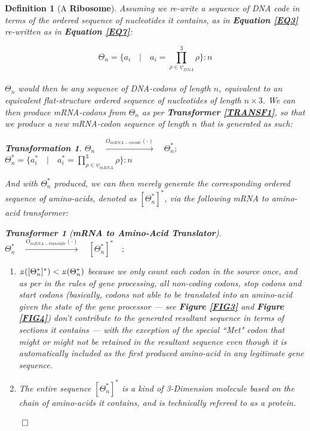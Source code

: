 \documentclass[a4paper, 18pt]{article} %
\newtheorem{defn}{Definition}
\newtheorem{trans}{Transformation}
\newtheorem{transf}{Transformer}
\newcommand{\invpi}{\rotatebox[origin=c]{180}{$\pi$}}
\begin{document}
\begin{defn}[A \textbf{Ribosome}]
\label{DEFRIBOSOME}
Assuming we re-write a sequence of DNA code in terms of the ordered sequence of nucleotides it contains, as in \textbf{Equation \ref{EQ3}} re-written as in \textbf{Equation \ref{EQ7}}:

 \begin{equation}
\label{EQ7}
\Theta_n = \{a_i \quad | \quad a_i = \prod\limits_{\rho \in \psi_{DNA}}^3 \rho \}:n
\end{equation}\\

$\Theta_n$ would then be any sequence of DNA-codons of length $n$, equivalent to an equivalent flat-structure ordered sequence of nucleotides of length $n \times 3$. We can then produce mRNA-codons from $\Theta_n$ as per \textbf{Transformer \ref{TRANSF1}}, so that we produce a new mRNA-codon sequence of length $n$ that is generated as such:

\begin{trans}
\label{TRANS1}
$\Theta_n \quad \xrightarrow{O_{mRNA-encode}(\cdot)} \quad \Theta^*_n;$\\
$\Theta^*_n = \{a_i^* \quad | \quad a_i^* = \prod\limits_{\rho \in \psi_{mRNA}}^3 \rho \}:n$
\end{trans}

And with $\Theta^*_n$ produced, we can then merely generate the corresponding ordered sequence of amino-acids, denoted as $[\Theta^*_n]^*$, via the following mRNA to amino-acid transformer: 

\begin{transf}[\textbf{mRNA to Amino-Acid Translator}]
\label{TRANSF2}
$\Theta^*_n \quad \xrightarrow{O_{mRNA-translate}(\cdot)} \quad [\Theta^*_n]^* \quad;$\\
\begin{enumerate}
\item $\invpi([\Theta^*_n]^*) < \invpi(\Theta^*_n)$ because we only count each codon in the source once, and as per in the rules of gene processing, all non-coding codons, stop codons and start codons (basically, codons not able to be translated into an amino-acid given the state of the gene processor --- see \textbf{Figure \ref{FIG3}} and \textbf{Figure \ref{FIG4}}) don't contribute to the generated resultant sequence in terms of sections it contains --- with the exception of the special ``Met" codon that might or might not be retained in the resultant sequence even though it is automatically included as the first produced amino-acid in any legitimate gene sequence.
\item The entire sequence $[\Theta^*_n]^*$ is a kind of 3-Dimension molecule based on the chain of amino-acids it contains, and is technically referred to as a protein.
\end{enumerate}
$\qed$
\end{transf}


\end{defn}
\end{document}
